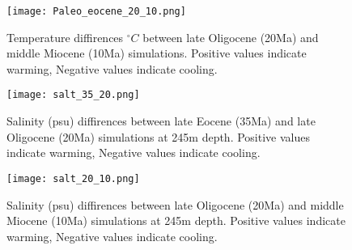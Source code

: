 \begin{figure}[H]
	\texttt{[image: Paleo\_eocene\_20\_10.png]}
	\caption{Temperature diffirences $^{\circ}C$ between late Oligocene (20Ma) and middle Miocene (10Ma) simulations. Positive values indicate warming, Negative values indicate cooling.}
	\label{fig:2010cooling}
\end{figure}



\begin{figure}[H]
	\texttt{[image: salt\_35\_20.png]}
	\caption{Salinity (psu) diffirences between late Eocene (35Ma) and late Oligocene (20Ma) simulations at 245m depth. Positive values indicate warming, Negative values indicate cooling.}
	\label{fig:salt3520cooling}
\end{figure}
\begin{figure}[H]
	\texttt{[image: salt\_20\_10.png]}
	\caption{Salinity (psu) diffirences between late Oligocene (20Ma) and middle Miocene (10Ma) simulations at 245m depth. Positive values indicate warming, Negative values indicate cooling.}
	\label{fig:salt2010cooling}
\end{figure}

